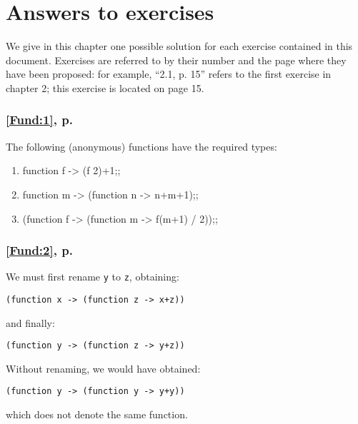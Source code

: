\chapter{Answers to exercises}\label{c:ans}
We give in this chapter one possible solution for each exercise
contained in this document. Exercises are referred to by their number
and the page where they have been proposed: for example, ``2.1, p.
15'' refers to the first exercise in chapter 2; this exercise is
located on page 15.

\newcommand{\exoref}[1]{\subsection*{\ref{#1}, p. \pageref{#1}}}

\exoref{Fund:1} The following (anonymous) functions have the required types:
\begin{enumerate}
\item
\begin{caml_example}
function f -> (f 2)+1;;
\end{caml_example}
\item
\begin{caml_example}
function m -> (function n -> n+m+1);;
\end{caml_example}
\item
\begin{caml_example}
(function f -> (function m -> f(m+1) / 2));;
\end{caml_example}
\end{enumerate}

\exoref{Fund:2} We must first rename {\tt y} to {\tt z}, obtaining:
\begin{verbatim}
(function x -> (function z -> x+z))
\end{verbatim}
and finally:
\begin{verbatim}
(function y -> (function z -> y+z))
\end{verbatim}
Without renaming, we would have obtained:
\begin{verbatim}
(function y -> (function y -> y+y))
\end{verbatim}
which does not denote the same function.

